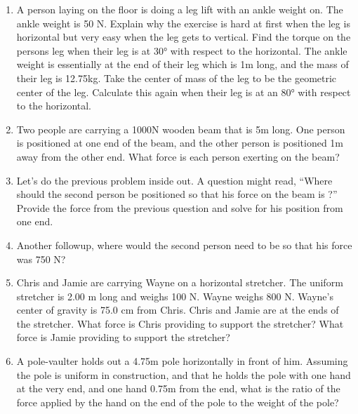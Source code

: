 \begin{enumerate}
	\newpage
	
	\item
	A person laying on the floor is doing a leg lift with an ankle weight on. The ankle weight is 50 N. Explain why the exercise is hard at first when the leg is horizontal but very easy when the leg gets to vertical. Find the torque on the persons leg when their leg is at \ang{30} with respect to the horizontal. The ankle weight is essentially at the end of their leg which is 1m long, and the mass of their leg is 12.75kg. Take the center of mass of the leg to be the geometric center of the leg. Calculate this again when their leg is at an \ang{80} with respect to the horizontal.\hugeskip
	
	\item
	Two people are carrying a 1000N wooden beam that is 5m long. One person is positioned at one end of the beam, and the other person is positioned 1m away from the other end. What force is each person exerting on the beam?\hugeskip
	
	\item 
	Let's do the previous problem inside out. A question might read, ``Where should the second person be positioned so that his force on the beam is \blank?'' Provide the force from the previous question and solve for his position from one end.
	
	\item 
	Another followup, where would the second person need to be so that his force was 750 N?\hugeskip
	
	\item
	Chris and Jamie are carrying Wayne on a horizontal stretcher. The uniform stretcher is 2.00 m long and weighs 100 N. Wayne weighs 800 N. Wayne's center of gravity is 75.0 cm from Chris. Chris and Jamie are at the ends of the stretcher. What force is Chris providing to support the stretcher? What force is Jamie providing to support the stretcher?\hugeskip
	
	\item
	A pole-vaulter holds out a 4.75m pole horizontally in front of him. Assuming the pole is uniform in construction, and that he holds the pole with one hand at the very end, and one hand 0.75m from the end, what is the ratio of the force applied by the hand on the end of the pole to the weight of the pole?\hugeskip
	

\end{enumerate}
